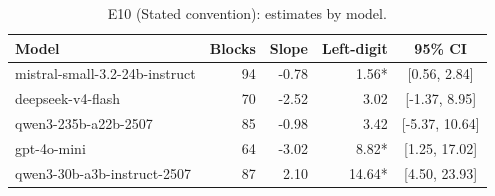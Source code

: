 \begin{table}[t]
\centering
\caption{E10 (Stated convention): estimates by model.}
\label{tab:e10model}
\small
\begin{tabular}{lrrrc}
\toprule
Model & Blocks & Slope & Left-digit & 95\% CI \\
\midrule
mistral-small-3.2-24b-instruct & 94 & -0.78 & 1.56* & [0.56, 2.84] \\
deepseek-v4-flash & 70 & -2.52 & 3.02 & [-1.37, 8.95] \\
qwen3-235b-a22b-2507 & 85 & -0.98 & 3.42 & [-5.37, 10.64] \\
gpt-4o-mini & 64 & -3.02 & 8.82* & [1.25, 17.02] \\
qwen3-30b-a3b-instruct-2507 & 87 & 2.10 & 14.64* & [4.50, 23.93] \\
\bottomrule
\end{tabular}
\end{table}
